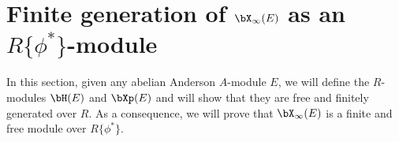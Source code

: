 \documentclass{amsart}
\numberwithin {equation}{section}
\begin{document}
\color{black}

\section{ Finite generation of ${\bX}_{\infty}(E)$ as an $R\{\phi^{*}\}$-module}
\label{fingenX}
In this section, given any abelian Anderson $A$-module $E$, we will define the $R$-modules $\bH(E)$ and $\bXp(E)$ and will
show that they are free and finitely generated over $R$. As a consequence, 
we will prove that $\bX_\infty(E)$ is a finite and free module over 
$R\{\phi^*\}$.
\end{document}
